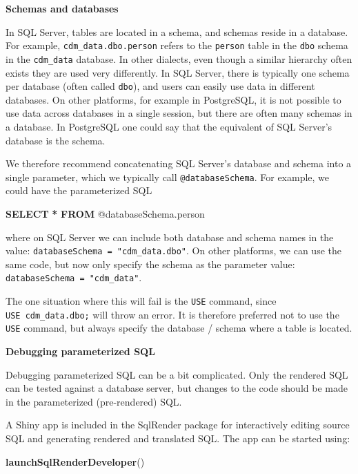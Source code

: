 \documentclass[11pt]{book}
\newenvironment{Shaded}{\begin{snugshade}}{\end{snugshade}}
\newcommand{\KeywordTok}[1]{\textcolor[rgb]{0.13,0.29,0.53}{\textbf{#1}}}
\newcommand{\NormalTok}[1]{#1}
\newcommand{\OperatorTok}[1]{\textcolor[rgb]{0.81,0.36,0.00}{\textbf{#1}}}
\theoremstyle{definition}
\theoremstyle{definition}
\theoremstyle{definition}
\theoremstyle{remark}
\begin{document}
\textbf{Schemas and databases}

In SQL Server, tables are located in a schema, and schemas reside in a database. For example, \texttt{cdm\_data.dbo.person} refers to the \texttt{person} table in the \texttt{dbo} schema in the \texttt{cdm\_data} database. In other dialects, even though a similar hierarchy often exists they are used very differently. In SQL Server, there is typically one schema per database (often called \texttt{dbo}), and users can easily use data in different databases. On other platforms, for example in PostgreSQL, it is not possible to use data across databases in a single session, but there are often many schemas in a database. In PostgreSQL one could say that the equivalent of SQL Server's database is the schema.

We therefore recommend concatenating SQL Server's database and schema into a single parameter, which we typically call \texttt{@databaseSchema}. For example, we could have the parameterized SQL

\begin{Shaded}
\begin{Highlighting}[]
\KeywordTok{SELECT} \OperatorTok{*} \KeywordTok{FROM}\NormalTok{ @databaseSchema.person}
\end{Highlighting}
\end{Shaded}

where on SQL Server we can include both database and schema names in the value: \texttt{databaseSchema\ =\ "cdm\_data.dbo"}. On other platforms, we can use the same code, but now only specify the schema as the parameter value: \texttt{databaseSchema\ =\ "cdm\_data"}.

The one situation where this will fail is the \texttt{USE} command, since \texttt{USE\ cdm\_data.dbo;} will throw an error. It is therefore preferred not to use the \texttt{USE} command, but always specify the database / schema where a table is located.

\textbf{Debugging parameterized SQL}

Debugging parameterized SQL can be a bit complicated. Only the rendered SQL can be tested against a database server, but changes to the code should be made in the parameterized (pre-rendered) SQL.

A Shiny app is included in the SqlRender package for interactively editing source SQL and generating rendered and translated SQL. The app can be started using:

\begin{Shaded}
\begin{Highlighting}[]
\KeywordTok{launchSqlRenderDeveloper}\NormalTok{()}
\end{Highlighting}
\end{Shaded}
\end{document}
